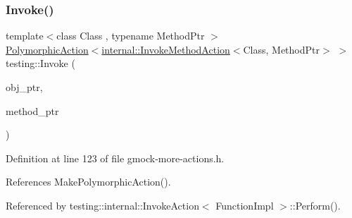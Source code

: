\subsubsection{\texorpdfstring{Invoke()}{Invoke()}\hspace{0.1cm}{\footnotesize\ttfamily [2/2]}}
{\footnotesize\ttfamily template$<$class Class , typename Method\+Ptr $>$ \\
\hyperlink{classtesting_1_1PolymorphicAction}{Polymorphic\+Action}$<$\hyperlink{classtesting_1_1internal_1_1InvokeMethodAction}{internal\+::\+Invoke\+Method\+Action}$<$Class, Method\+Ptr$>$ $>$ testing\+::\+Invoke (\begin{DoxyParamCaption}\item[{Class $\ast$}]{obj\+\_\+ptr,  }\item[{Method\+Ptr}]{method\+\_\+ptr }\end{DoxyParamCaption})}



Definition at line 123 of file gmock-\/more-\/actions.\+h.



References Make\+Polymorphic\+Action().



Referenced by testing\+::internal\+::\+Invoke\+Action$<$ Function\+Impl $>$\+::\+Perform().


